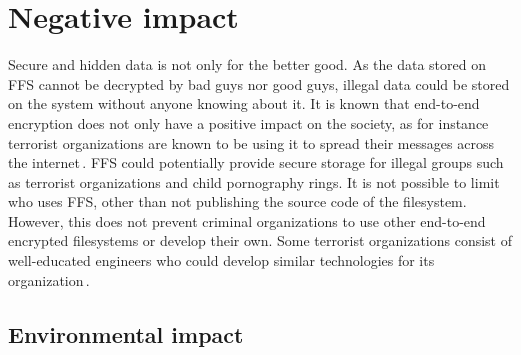 \section{Negative impact}
Secure and hidden data is not only for the better good. As the data stored on FFS cannot be decrypted by bad guys nor good guys, illegal data could be stored on the system without anyone knowing about it. It is known that end-to-end encryption does not only have a positive impact on the society, as for instance terrorist organizations are known to be using it to spread their messages across the internet\,\cite{ruddEncryptionCounterterrorismGetting2017}. FFS could potentially provide secure storage for illegal groups such as terrorist organizations and child pornography rings. It is not possible to limit who uses FFS, other than not publishing the source code of the filesystem. However, this does not prevent criminal organizations to use other end-to-end encrypted filesystems or develop their own. Some terrorist organizations consist of well-educated engineers who could develop similar technologies for its organization\,\cite{berrebyEngineeringTerror2010}.

\subsection{Environmental impact}

